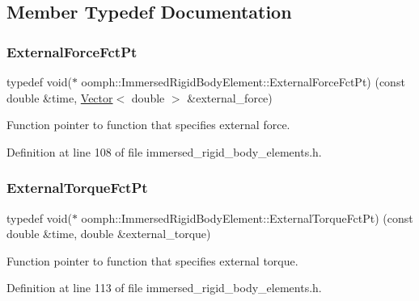 \subsection{Member Typedef Documentation}
\mbox{\label{classoomph_1_1ImmersedRigidBodyElement_a7a43bfd54213becfb135b594720b0539}} 
\subsubsection{\texorpdfstring{External\+Force\+Fct\+Pt}{ExternalForceFctPt}}
{\footnotesize\ttfamily typedef void($\ast$ oomph\+::\+Immersed\+Rigid\+Body\+Element\+::\+External\+Force\+Fct\+Pt) (const double \&time, \hyperlink{classoomph_1_1Vector}{Vector}$<$ double $>$ \&external\+\_\+force)}



Function pointer to function that specifies external force. 



Definition at line 108 of file immersed\+\_\+rigid\+\_\+body\+\_\+elements.\+h.

\mbox{\label{classoomph_1_1ImmersedRigidBodyElement_a455638a1d0e9547290d835513d00c40e}} 
\subsubsection{\texorpdfstring{External\+Torque\+Fct\+Pt}{ExternalTorqueFctPt}}
{\footnotesize\ttfamily typedef void($\ast$ oomph\+::\+Immersed\+Rigid\+Body\+Element\+::\+External\+Torque\+Fct\+Pt) (const double \&time, double \&external\+\_\+torque)}



Function pointer to function that specifies external torque. 



Definition at line 113 of file immersed\+\_\+rigid\+\_\+body\+\_\+elements.\+h.



